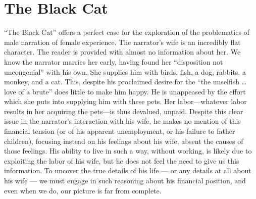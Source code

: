 \documentclass[man,12pt,natbib]{apa6}
\begin{document}
%

\section{The Black Cat}
\nocite{Poe12b}

``The Black Cat'' offers a perfect case for the exploration of the problematics
of male narration of female experience. The narrator's wife is an incredibly
flat character. The reader is provided with almost no information about her.
We know the narrator marries her early, having found her ``disposition not
uncongenial'' with his own. She supplies him with birds, fish, a dog, rabbits,
a monkey, and a cat. This, despite his proclaimed desire for the ``the
unselfish \dots{} love of a brute'' does little to make him happy. He is
unappeased by the effort which she puts into supplying him with these pets. Her
labor---whatever labor results in her acquiring the pets---is thus devalued,
unpaid. Despite this clear issue in the narrator's interaction with his wife,
he makes no mention of this financial tension (or of his apparent unemployment,
or his failure to father children), focusing instead on his feelings about his
wife, absent the causes of those feelings. His ability to live in such a way,
without working, is likely due to exploiting the labor of his wife, but he does
not feel the need to give us this information. To uncover the true details of
his life --- or any details at all about his wife --- we must engage in such
reasoning about his financial position, and even when we do, our picture is far
from complete.
\end{document}
